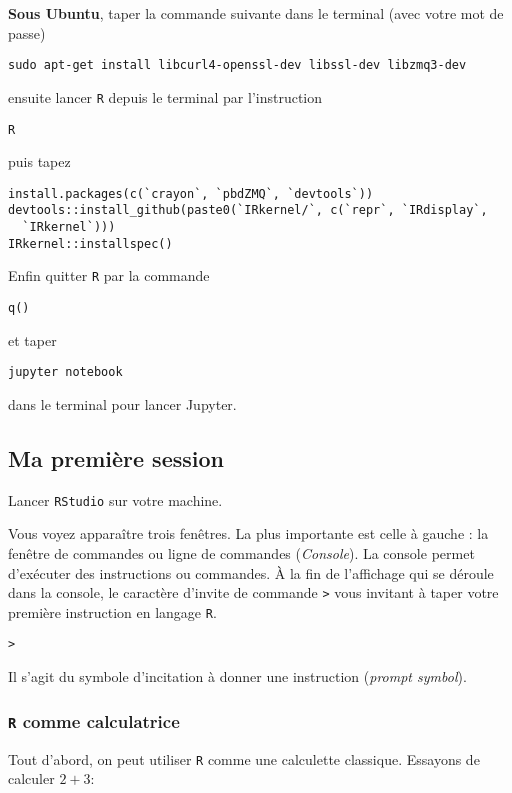 \documentclass[11pt]{article}
\makeatletter
\numberwithin{equation}{section}
\theoremstyle{remark}
\newenvironment{kframe}{%
 \def\at@end@of@kframe{}%
 \ifinner\ifhmode%
  \def\at@end@of@kframe{\end{minipage}}%
  \begin{minipage}{\columnwidth}%
 \fi\fi%
 \def\FrameCommand##1{\hskip\@totalleftmargin \hskip-\fboxsep
 \colorbox{shadecolor}{##1}\hskip-\fboxsep
     \hskip-\linewidth \hskip-\@totalleftmargin \hskip\columnwidth}%
 \MakeFramed {\advance\hsize-\width
   \@totalleftmargin\z@ \linewidth\hsize
   \@setminipage}}%
 {\par\unskip\endMakeFramed%
 \at@end@of@kframe}
\newenvironment{knitrout}{}{}
\makeatother
\begin{document}
\begin{enumerate}
{\bf Sous Ubuntu}, taper la commande suivante dans le terminal (avec votre mot de passe)
\begin{verbatim}
sudo apt-get install libcurl4-openssl-dev libssl-dev libzmq3-dev
\end{verbatim}
ensuite lancer \texttt{R} depuis le terminal par l'instruction
\begin{verbatim}
R
\end{verbatim}
puis tapez
\begin{verbatim}
install.packages(c(`crayon`, `pbdZMQ`, `devtools`))
devtools::install_github(paste0(`IRkernel/`, c(`repr`, `IRdisplay`,
  `IRkernel`)))
IRkernel::installspec()
\end{verbatim}
Enfin quitter \texttt{R} par la commande
\begin{verbatim}
q()
\end{verbatim}
et taper 
\begin{verbatim}
jupyter notebook
\end{verbatim}
dans le terminal pour lancer Jupyter.
\end{enumerate}




\subsection{Ma première session}

Lancer \texttt{RStudio} sur votre machine.

Vous voyez apparaître trois fenêtres. La plus importante est celle à gauche :  la fenêtre de commandes ou ligne de commandes ({\it Console}). La console   permet d'exécuter des instructions ou commandes.  \`A la fin de l'affichage qui se déroule dans la console,
le caractère d'invite de commande \texttt> vous invitant à taper votre première
instruction en langage \texttt R.
\begin{knitrout}
\color{fgcolor}\begin{kframe}
\begin{alltt}
>
\end{alltt}
\end{kframe}
\end{knitrout}
Il s'agit du symbole d'incitation à donner une instruction ({\it prompt symbol}).


 


\subsubsection{\texttt R comme calculatrice}
Tout d'abord, on peut utiliser  \texttt R   comme une calculette classique. Essayons de calculer $2+3$:
\end{document}
